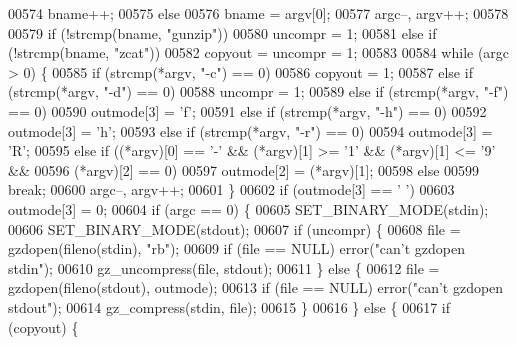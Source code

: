 \begin{DoxyCode}
{{{{{{{{{{{{00574       bname++;
00575     \textcolor{keywordflow}{else}
00576       bname = argv[0];
00577     argc--, argv++;
00578 
00579     \textcolor{keywordflow}{if} (!strcmp(bname, \textcolor{stringliteral}{"gunzip"}))
00580       uncompr = 1;
00581     \textcolor{keywordflow}{else} \textcolor{keywordflow}{if} (!strcmp(bname, \textcolor{stringliteral}{"zcat"}))
00582       copyout = uncompr = 1;
00583 
00584     \textcolor{keywordflow}{while} (argc > 0) \{
00585       \textcolor{keywordflow}{if} (strcmp(*argv, \textcolor{stringliteral}{"-c"}) == 0)
00586         copyout = 1;
00587       \textcolor{keywordflow}{else} \textcolor{keywordflow}{if} (strcmp(*argv, \textcolor{stringliteral}{"-d"}) == 0)
00588         uncompr = 1;
00589       \textcolor{keywordflow}{else} \textcolor{keywordflow}{if} (strcmp(*argv, \textcolor{stringliteral}{"-f"}) == 0)
00590         outmode[3] = \textcolor{charliteral}{'f'};
00591       \textcolor{keywordflow}{else} \textcolor{keywordflow}{if} (strcmp(*argv, \textcolor{stringliteral}{"-h"}) == 0)
00592         outmode[3] = \textcolor{charliteral}{'h'};
00593       \textcolor{keywordflow}{else} \textcolor{keywordflow}{if} (strcmp(*argv, \textcolor{stringliteral}{"-r"}) == 0)
00594         outmode[3] = \textcolor{charliteral}{'R'};
00595       \textcolor{keywordflow}{else} \textcolor{keywordflow}{if} ((*argv)[0] == \textcolor{charliteral}{'-'} && (*argv)[1] >= \textcolor{charliteral}{'1'} && (*argv)[1] <= \textcolor{charliteral}{'9'} &&
00596                (*argv)[2] == 0)
00597         outmode[2] = (*argv)[1];
00598       \textcolor{keywordflow}{else}
00599         \textcolor{keywordflow}{break};
00600       argc--, argv++;
00601     \}
00602     \textcolor{keywordflow}{if} (outmode[3] == \textcolor{charliteral}{' '})
00603         outmode[3] = 0;
00604     \textcolor{keywordflow}{if} (argc == 0) \{
00605         SET\_BINARY\_MODE(stdin);
00606         SET\_BINARY\_MODE(stdout);
00607         \textcolor{keywordflow}{if} (uncompr) \{
00608             file = gzdopen(fileno(stdin), \textcolor{stringliteral}{"rb"});
00609             \textcolor{keywordflow}{if} (file == NULL) error(\textcolor{stringliteral}{"can't gzdopen stdin"});
00610             gz\_uncompress(file, stdout);
00611         \} \textcolor{keywordflow}{else} \{
00612             file = gzdopen(fileno(stdout), outmode);
00613             \textcolor{keywordflow}{if} (file == NULL) error(\textcolor{stringliteral}{"can't gzdopen stdout"});
00614             gz\_compress(stdin, file);
00615         \}
00616     \} \textcolor{keywordflow}{else} \{
00617         \textcolor{keywordflow}{if} (copyout) \{
}}}}}}}}}}}}
\end{DoxyCode}
